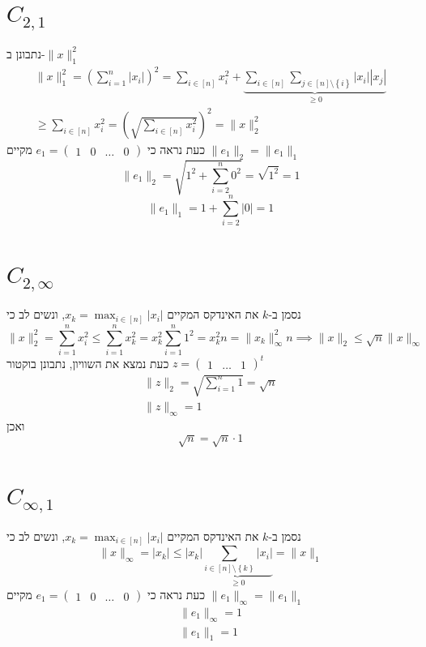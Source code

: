 \documentclass[12pt, titlepage]{article}
\begin{document}
\section*{$C_{2,1}$}
נתבונן ב-$\lVert x\rVert_1^2$
\begin{gather*}
    \lVert x \rVert_1^2 = \left(\sum_{i=1}^n \left|x_i\right|\right)^2 = \sum_{i\in\left[n\right]} x_i^2 + \underbrace{\sum_{i\in\left[n\right]}\sum_{j\in\left[n\right]\setminus \left\{i\right\}} \left|x_i\right| \left|x_j\right|}_{\geq 0}
    \\ \geq \sum_{i\in\left[n\right]} x_i^2 = \left(\sqrt{\sum_{i\in\left[n\right]} x_i^2}\right)^2 = \lVert x\rVert_2^2
\end{gather*}
כעת נראה כי $e_1=\begin{pmatrix}1&0&\ldots&0\end{pmatrix}$ מקיים $\lVert e_1 \rVert_2 = \lVert e_1 \rVert_1$
\[
  \lVert e_1 \rVert_2 = \sqrt{1^2 + \sum_{i=2}^n 0^2} = \sqrt{1^2} = 1
\]
\[
  \lVert e_1 \rVert_1 = 1 + \sum_{i=2}^n \left|0\right| = 1
\]
\section*{$C_{2,\infty}$}
נסמן ב-$k$ את האינדקס המקיים $x_k = \max_{i\in\left[n\right]} \left|x_i\right|$, ונשים לב כי
\[
  \lVert x\rVert_2^2  = \sum_{i=1}^n x_i^2 \leq \sum_{i=1}^n x_k^2 = x_k^2 \sum_{i=1}^n 1^2 = x_k^2 n = \lVert x_k\rVert_\infty^2 n \implies \lVert x\rVert_2 \leq \sqrt{n} \lVert x\rVert_\infty
\]
כעת נמצא את השוויון, נתבונן בוקטור $z=\begin{pmatrix}1&\ldots&1\end{pmatrix}^t$
\begin{gather*}
  \lVert z\rVert_2 = \sqrt{\sum_{i=1}^n 1} = \sqrt{n}\\
  \lVert z \rVert_\infty = 1
\end{gather*}
ואכן
\[
  \sqrt{n} = \sqrt{n} \cdot 1
\]
\section*{$C_{\infty,1}$}
נסמן ב-$k$ את האינדקס המקיים $x_k = \max_{i\in\left[n\right]} \left|x_i\right|$, ונשים לב כי
\[
  \lVert x\rVert_\infty = \left|x_k\right| \leq  \left|x_k\right| \underbrace{\sum_{i\in\left[n\right]\setminus \left\{k\right\}} \left|x_i\right|}_{\geq 0} = \lVert x\rVert_1
\]
כעת נראה כי $e_1=\begin{pmatrix}1&0&\ldots&0\end{pmatrix}$ מקיים $\lVert e_1 \rVert_\infty = \lVert e_1 \rVert_1$
\begin{gather*}
  \lVert e_1\rVert_\infty = 1\\
  \lVert e_1\rVert_1 = 1
\end{gather*}
\end{document}
